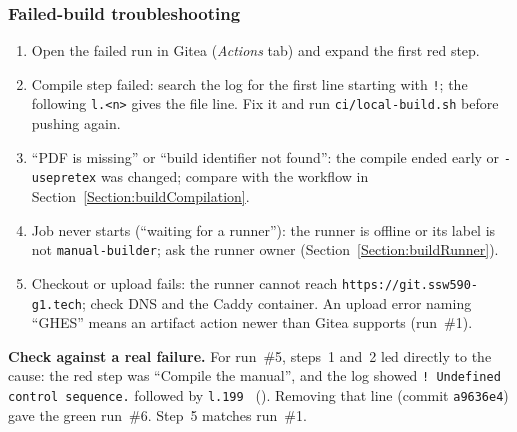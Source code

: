 \subsubsection{Failed-build troubleshooting}
\begin{enumerate}[nosep]
  \item Open the failed run in Gitea (\emph{Actions} tab) and expand the first red step.
  \item Compile step failed: search the log for the first line starting with \texttt{!}; the following \texttt{l.<n>} gives the file line. Fix it and run \texttt{ci/local-build.sh} before pushing again.
  \item ``PDF is missing'' or ``build identifier not found'': the compile ended early or \texttt{-usepretex} was changed; compare with the workflow in Section~\ref{Section:buildCompilation}.
  \item Job never starts (``waiting for a runner''): the runner is offline or its label is not \texttt{manual-builder}; ask the runner owner (Section~\ref{Section:buildRunner}).
  \item Checkout or upload fails: the runner cannot reach \texttt{https://git.ssw590-g1.tech}; check DNS and the Caddy container. An upload error naming ``GHES'' means an artifact action newer than Gitea supports (run~\#1).
\end{enumerate}
\textbf{Check against a real failure.} For run~\#5, steps~1 and~2 led directly
to the cause: the red step was ``Compile the manual'', and the log showed
\texttt{! Undefined control sequence.} followed by
\texttt{l.199 \string\ControlledFailureForRowSix} (). Removing that
line (commit \texttt{a9636e4}) gave the green run~\#6. Step~5 matches run~\#1.

